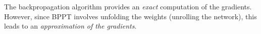 \begin{frame}
The backpropagation algorithm provides an \emph{exact} computation of the gradients.
However, 
since BPPT involves unfolding the weights (unrolling the network), this leads to an \emph{approximation of the gradients}.
\end{frame}
